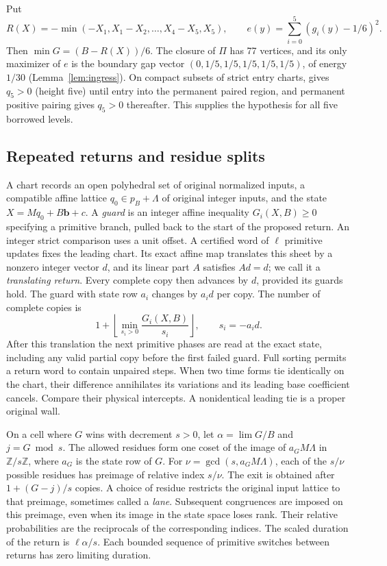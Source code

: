 \documentclass[11pt,reqno]{amsart}
\theoremstyle{definition}
\newcommand{\Z}{\mathbb Z}
\begin{document}
Put
\[
 R(X)=-\min(-X_1,X_1-X_2,\ldots,X_4-X_5,X_5),\qquad
 e(y)=\sum_{i=0}^5(g_i(y)-1/6)^2 .
\]
Then \(\min G=(B-R(X))/6\). The closure of \(\Pi\) has 77 vertices,
and its only maximizer of \(e\) is the boundary gap vector
\((0,1/5,1/5,1/5,1/5,1/5)\), of energy \(1/30\)
(Lemma~\ref{lem:ingress}). On compact subsets of strict entry charts, \cite[Section~5]{G6} gives
\(q_5>0\) (height five) until entry into the permanent paired region, and
permanent positive pairing gives \(q_5>0\) thereafter. This supplies the
hypothesis for all five borrowed levels.

\subsection{Repeated returns and residue splits}\label{sec:returns}
A chart records an open polyhedral set of original normalized inputs,
a compatible affine lattice \(q_0\in p_B+\Lambda\) of original integer
inputs, and the state \(X=Mq_0+B\mathbf b+c\). A \emph{guard} is an integer affine
inequality \(G_i(X,B)\ge0\) specifying a primitive branch, pulled back to
the start of the proposed return. An integer strict comparison uses a
unit offset. A certified word of \(\ell\) primitive updates fixes the
leading chart. Its exact affine map translates this sheet by a
nonzero integer vector \(d\), and its linear part \(A\) satisfies
\(Ad=d\); we call it a \emph{translating return}. Every complete copy
then advances by \(d\), provided its
guards hold. The guard with state row \(a_i\) changes by \(a_i d\) per
copy. The number of complete copies is
\[
 1+\left\lfloor\min_{s_i>0}\frac{G_i(X,B)}{s_i}\right\rfloor,
 \qquad s_i=-a_i d .
\]
After this translation the next primitive phases are read at the exact
state, including any valid partial copy before the first failed guard.
Full sorting permits a return word to contain unpaired steps. When
two time forms tie identically on the chart, their difference
annihilates its variations and its leading base coefficient cancels.
Compare their physical intercepts. A nonidentical leading tie is a
proper original wall.

On a cell where \(G\) wins with decrement \(s>0\), let
\(\alpha=\lim G/B\) and \(j=G\bmod s\). The allowed residues form one coset
of the image of \(a_G M\Lambda\) in \(\Z/s\Z\), where \(a_G\) is the
state row of \(G\). For \(\nu=\gcd(s,a_G M\Lambda)\), each of the \(s/\nu\)
possible residues has preimage of relative index \(s/\nu\). The exit
is obtained after \(1+(G-j)/s\) copies. A choice of residue restricts the
original input lattice to that preimage, sometimes called a \emph{lane}.
Subsequent congruences are imposed on this preimage, even when its
image in the state space loses rank. Their relative probabilities
are the reciprocals of the corresponding indices. The scaled duration
of the return is \(\ell\alpha/s\). Each bounded sequence of primitive
switches between returns has zero limiting duration.
\end{document}

